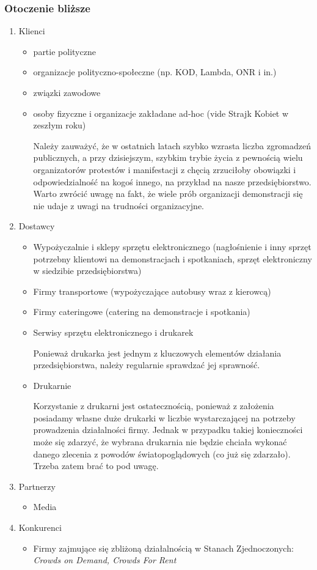 \documentclass{article}
\begin{document}
\subsubsection{Otoczenie bliższe} %
\begin{enumerate}
\item Klienci
	\begin{itemize}
	\item partie polityczne
	\item organizacje polityczno-społeczne (np. KOD, Lambda, ONR i in.)
	\item związki zawodowe
	\item osoby fizyczne i organizacje zakładane ad-hoc (vide Strajk Kobiet w zeszłym roku)
	
	Należy zauważyć, że w ostatnich latach szybko wzrasta liczba zgromadzeń publicznych, a przy dzisiejszym, szybkim trybie życia z pewnością wielu organizatorów protestów i manifestacji z chęcią zrzuciłoby obowiązki i odpowiedzialność na kogoś innego, na przykład na nasze przedsiębiorstwo. Warto zwrócić uwagę na fakt, że wiele prób organizacji demonstracji się nie udaje z uwagi na trudności organizacyjne.
	
	
	\end{itemize}
\item Dostawcy
	\begin{itemize}
	\item Wypożyczalnie i sklepy sprzętu elektronicznego (nagłośnienie i inny sprzęt potrzebny klientowi na demonstracjach i spotkaniach, sprzęt elektroniczny w siedzibie przedsiębiorstwa)
	\item Firmy transportowe (wypożyczające autobusy wraz z kierowcą)
	\item Firmy cateringowe (catering na demonstracje i spotkania)
	\item Serwisy sprzętu elektronicznego i drukarek
	
	Ponieważ drukarka jest jednym z kluczowych elementów działania przedsiębiorstwa, należy regularnie sprawdzać jej sprawność.
	\item Drukarnie
	
	Korzystanie z drukarni jest ostatecznością, ponieważ z założenia posiadamy własne duże drukarki w liczbie wystarczającej na potrzeby prowadzenia działalności firmy. Jednak w przypadku takiej konieczności może się zdarzyć, że wybrana drukarnia nie będzie chciała wykonać danego zlecenia z powodów światopoglądowych (co już się zdarzało). Trzeba zatem brać to pod uwagę.
	\end{itemize}
\item Partnerzy
	\begin{itemize}
	\item Media
	\end{itemize}
\item Konkurenci
	\begin{itemize}
	\item Firmy zajmujące się zbliżoną działalnością w Stanach Zjednoczonych: \textit{Crowds on Demand, Crowds For Rent}
	

\end{itemize}
\end{enumerate}
\end{document}
